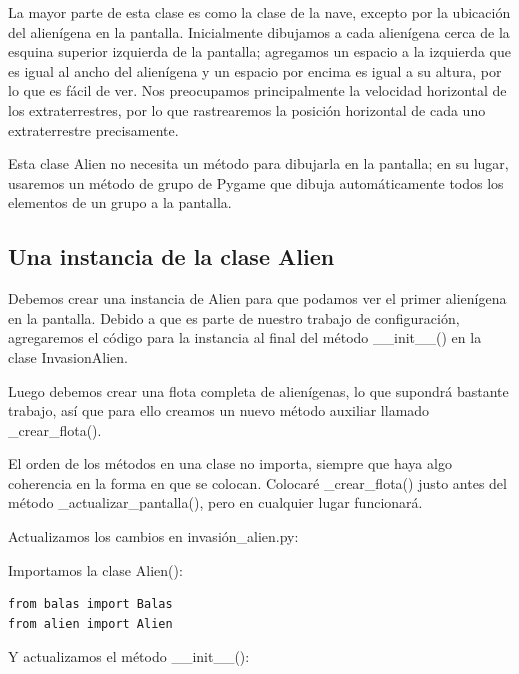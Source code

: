 La mayor parte de esta clase es como la clase de la nave, excepto por la ubicación del alienígena en la pantalla. 
Inicialmente dibujamos a cada alienígena cerca de la esquina superior izquierda de la pantalla;  agregamos un espacio 
a la izquierda que es igual al ancho del alienígena y un espacio por encima es igual a su altura, por lo que es fácil de ver. 
Nos preocupamos principalmente la velocidad horizontal de los extraterrestres, por lo que rastrearemos la posición horizontal de cada uno
extraterrestre precisamente.

Esta clase Alien no necesita un método para dibujarla en la pantalla; en su lugar, usaremos un método de grupo de Pygame que dibuja automáticamente todos los elementos de un grupo a la pantalla.

\subsection{Una instancia de la clase Alien}

Debemos crear una instancia de Alien para que podamos ver el primer alienígena en la pantalla. Debido a que es parte de nuestro trabajo de configuración, agregaremos el código para la instancia al final del método {\ttfamily \_\_init\_\_()} en la clase {\ttfamily InvasionAlien}. 

Luego debemos crear una flota completa de alienígenas, lo que supondrá bastante trabajo, así que para ello 
creamos  un nuevo método auxiliar llamado  {\ttfamily \_crear\_flota()}.

El orden de los métodos en una clase no importa, siempre que haya algo coherencia en la forma en que se colocan.
Colocaré {\ttfamily \_crear\_flota()} justo antes del método {\ttfamily \_actualizar\_pantalla()}, pero en cualquier
lugar funcionará. \vspace{0.3cm}


\noindent Actualizamos los cambios en  {\ttfamily invasión\_alien.py}:

\noindent Importamos la clase {\ttfamily Alien()}:


\hspace{-2.4cm}{\ttfamily \scriptsize invasión}

\vspace{-0.2cm}
\hspace{-2.1cm}{\ttfamily \scriptsize \_alien.py}\vspace{-0.84cm}
\begin{lstlisting}
from balas import Balas
from alien import Alien	
\end{lstlisting}
\noindent Y actualizamos el método {\ttfamily \_\_init\_\_()}:

